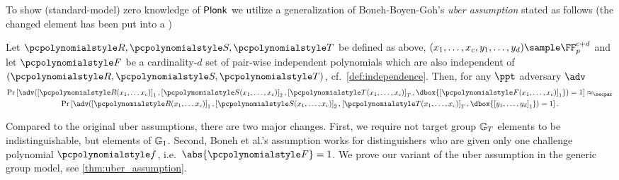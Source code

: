 \documentclass[runningheads,10pt]{llncs}
\newcommand\dboxed[1]{\dbox{\ensuremath{#1}}}
\begin{document}
To show (standard-model) zero knowledge of $\textnormal{\textsf{Plonk}}$ we utilize a generalization
of Boneh-Boyen-Goh's \emph{uber assumption} \cite{EC:BonBoyGoh05} stated as
follows (the changed element has been put into a )
\begin{definition}
	\label{def:uber_assumption}
	Let $\pR, \pS, \pT$ be defined as above,
    $(x_1, \ldots, x_c, y_1, \ldots, y_{d}) \sample \FF_p^{c + d}$ and let
    $\p{F}$ be a cardinality-$d$ set of pair-wise independent polynomials which are also
    independent of $(\pR, \pS, \pT)$, cf.~\cref{def:independence}.  Then, for
    any $\ppt$ adversary $\adv$
	\begin{multline*}
      \Pr\left[\adv(\gone{\pR(x_1, \ldots x_c)}, \gtwo{\pS(x_1, \ldots, x_c)},
		\gtar{\pT(x_1, \ldots, x_c)}, \dboxed{\gone{\p{F}(x_1, \ldots, x_c)}}) = 1\right] \approx_\secpar \\
      \Pr\left[\adv(\gone{\pR(x_1, \ldots x_c)}, \gtwo{\pS(x_1, \ldots, x_c)},
        \gtar{\pT(x_1, \ldots, x_c)}, \dboxed{\gone{y_1, \ldots, y_{d}}}) =
        1\right].
	\end{multline*}
  \end{definition}

  Compared to the original uber assumptions, there are two major changes. First,
  we require not target group $\mathbb{G}_T$ elements to be indistinguishable, but
  elements of $\mathbb{G}_1$. Second, Boneh et al.'s assumption works for
  distinguishers who are given only one challenge polynomial $\p{f}$,
  i.e.~$\abs{\p{F}} = 1$.  We prove our variant of the uber assumption in the
  generic group model, see \cref{thm:uber_assumption}.
\end{document}
